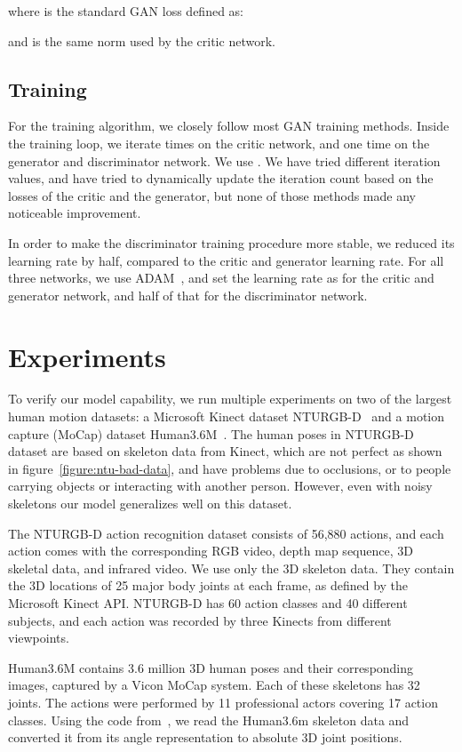 \documentclass[10pt,twocolumn,letterpaper]{article}
\begin{document}
where  is the standard GAN loss defined as:


and  is the same  norm used by the critic network.

\subsection{Training}
For the training algorithm, we closely follow most GAN training methods. Inside the training loop, we iterate  times on the critic network, and one time on the generator and discriminator network. We use . We have tried different iteration values, and have tried to dynamically update the iteration count based on the losses of the critic and the generator, but none of those methods made any noticeable improvement.

In order to make the discriminator training procedure more stable, we reduced its learning rate by half, compared to the critic and generator learning rate. For all three networks, we use ADAM~\cite{corr2014:Kingma}, and set the learning rate as  for the critic and generator network, and half of that for the discriminator network.

\section{Experiments}
To verify our model capability, we run multiple experiments on two of the largest human motion datasets: a Microsoft Kinect dataset NTURGB-D~\cite{cvpr2016:Shahroudy} and a motion capture (MoCap) dataset Human3.6M~\cite{pami2014:Ionescu,iccv2011:Ionescu}. The human poses in NTURGB-D dataset are based on skeleton data from Kinect, which are not perfect as shown in figure~\ref{figure:ntu-bad-data}, and have problems due to occlusions, or to people carrying objects or interacting with another person. However, even with noisy skeletons our model generalizes well on this dataset.

The NTURGB-D action recognition dataset consists of 56,880 actions, and each action comes with the corresponding RGB video, depth map sequence, 3D skeletal data, and infrared video. We use only the 3D skeleton data. They contain the 3D locations of 25 major body joints at each frame, as defined by the Microsoft Kinect API. NTURGB-D has 60 action classes and 40 different subjects, and each action was recorded by three Kinects from different viewpoints.

Human3.6M contains 3.6 million 3D human poses and their corresponding images, captured by a Vicon MoCap system. Each of these skeletons has 32 joints. The actions were performed by 11 professional actors covering 17 action classes. Using the code from~\cite{cvpr2017:julieta}, we read the Human3.6m skeleton data and converted it from its angle representation to absolute 3D joint positions.
\end{document}
